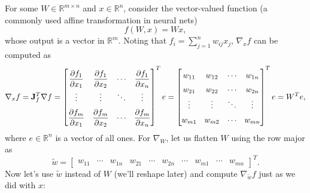 For some $W \in \mathbb{R}^{m \times n}$ and $x \in \mathbb{R}^n$, consider the vector-valued function (a commonly used affine transformation in neural nets)
$$
f(W, x) = Wx,
$$
whose output is a vector in $\mathbb{R}^m$. Noting that $f_i = \sum_{j=1}^n w_{ij} x_j$, $\nabla_x f$ can be computed as
$$
\renewcommand{\arraystretch}{2}
\nabla_x f = \J_f^T \nabla f =
\begin{bmatrix}
    \dfrac{\partial f_1}{\partial x_1} & \dfrac{\partial f_1}{\partial x_2} & \cdots & \dfrac{\partial f_1}{\partial x_n} \\
    \vdots & \vdots & \ddots & \vdots \\
    \dfrac{\partial f_m}{\partial x_1} & \dfrac{\partial f_m}{\partial x_2} & \cdots & \dfrac{\partial f_m}{\partial x_n}
\end{bmatrix}^T e
\renewcommand{\arraystretch}{1.5}
= \begin{bmatrix}
    w_{11} & w_{12} & \cdots & w_{1n} \\
    w_{21} & w_{22} & \cdots & w_{2n} \\
    \vdots & \vdots & \ddots & \vdots \\
    w_{m1} & w_{m2} & \cdots & w_{mn} \\
\end{bmatrix}^T e = W^T e,
$$
where $e \in \mathbb{R}^n$ is a vector of all ones. For $\nabla_W$, let us flatten $W$ using the row major as
$$
\widetilde{w} = \begin{bmatrix}
    w_{11} & \cdots & w_{1n} & w_{21} & \cdots & w_{2n} & \cdots & w_{m1} & \cdots & w_{mn}
    \end{bmatrix}^T.
$$
Now let's use $\widetilde{w}$ instead of $W$ (we'll reshape later) and compute $\nabla_{\widetilde{w}} f$ just as we did with $x$:
